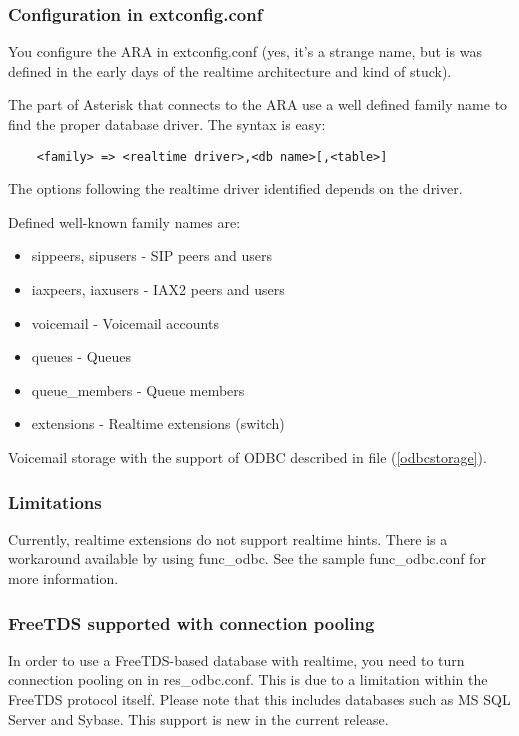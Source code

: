 \subsubsection{Configuration in extconfig.conf}

You configure the ARA in extconfig.conf (yes, it's a strange name, but
is was defined in the early days of the realtime architecture and kind
of stuck).

The part of Asterisk that connects to the ARA use a well defined family
name to find the proper database driver. The syntax is easy:

\begin{verbatim}
    <family> => <realtime driver>,<db name>[,<table>]
\end{verbatim}

The options following the realtime driver identified depends on the
driver.

Defined well-known family names are:

\begin{itemize}
  \item sippeers, sipusers - SIP peers and users
  \item iaxpeers, iaxusers - IAX2 peers and users
  \item voicemail - Voicemail accounts
  \item queues - Queues
  \item queue\_members - Queue members
  \item extensions - Realtime extensions (switch)
\end{itemize}

Voicemail storage with the support of ODBC described in file
 (\ref{odbcstorage}).

\subsubsection{Limitations}

Currently, realtime extensions do not support realtime hints.  There is
a workaround available by using func\_odbc.  See the sample func\_odbc.conf
for more information.

\subsubsection{FreeTDS supported with connection pooling}

In order to use a FreeTDS-based database with realtime, you need to turn
connection pooling on in res\_odbc.conf.  This is due to a limitation within
the FreeTDS protocol itself.  Please note that this includes databases such
as MS SQL Server and Sybase.  This support is new in the current release.
